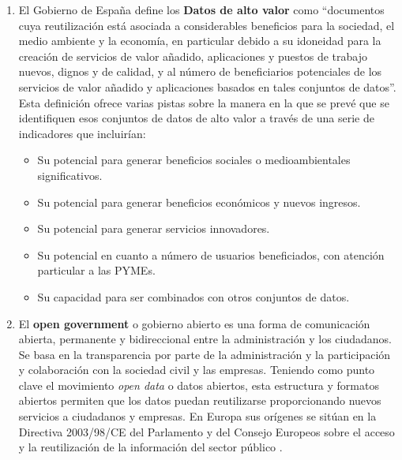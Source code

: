 \begin{enumerate}
	\item El Gobierno de España define los \textbf{Datos de alto valor} \label{def1} como ``documentos cuya reutilización está asociada a considerables beneficios para la sociedad, el medio ambiente y la economía, en particular debido a su idoneidad para la creación de servicios de valor añadido, aplicaciones y puestos de trabajo nuevos, dignos y de calidad, y al número de beneficiarios potenciales de los servicios de valor añadido y aplicaciones basados en tales conjuntos de datos''. Esta definición ofrece varias pistas sobre la manera en la que se prevé que se identifiquen esos conjuntos de datos de alto valor a través de una serie de indicadores que incluirían:
	\begin{itemize}
		\item Su potencial para generar beneficios sociales o medioambientales significativos.
		\item Su potencial para generar beneficios económicos y nuevos ingresos.
		\item Su potencial para generar servicios innovadores.
		\item Su potencial en cuanto a número de usuarios beneficiados, con atención particular a las PYMEs.
		\item Su capacidad para ser combinados con otros conjuntos de datos.
	\end{itemize}

	\item El \textbf{open government} \label{def2} o gobierno abierto es una forma de comunicación abierta, permanente y bidireccional entre la administración y los ciudadanos. Se basa en la transparencia por parte de la administración y la participación y colaboración con la sociedad civil y las empresas. Teniendo como punto clave el movimiento \textit{open data} o datos abiertos, esta estructura y formatos abiertos permiten que los datos puedan reutilizarse proporcionando nuevos servicios a ciudadanos y empresas. En Europa sus orígenes se sitúan en la Directiva 2003/98/CE del Parlamento y del Consejo Europeos sobre el acceso y la reutilización de la información del sector público \citep{OperGovernment2011}. \\


\end{enumerate}
